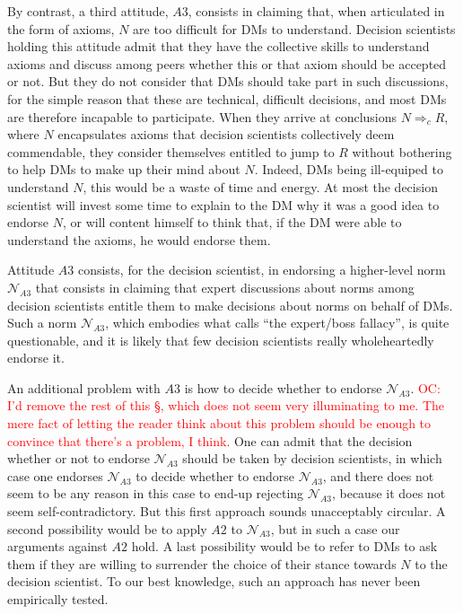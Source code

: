 \documentclass[preprint, french, english, 11pt, authoryear]{elsarticle}%
\newcommand{\commentOC}[1]{\textcolor{red}{OC: #1}}
\begin{document}
By contrast, a third attitude, $A3$, consists in claiming that, when articulated in the form of axioms, $N$ are too difficult for \acp{DM} to understand. Decision scientists holding this attitude admit that they have the collective skills to understand axioms and discuss among peers whether this or that axiom should be accepted or not. But they do not consider that \acp{DM} should take part in such discussions, for the simple reason that these are technical, difficult decisions, and most \acp{DM} are therefore incapable to participate. When they arrive at conclusions $N ⇒_c R$, where $N$ encapsulates axioms that decision scientists collectively deem commendable, they consider themselves entitled to jump to $R$ without bothering to help \acp{DM} to make up their mind about $N$. Indeed, \acp{DM} being ill-equiped to understand $N$, this would be a waste of time and energy. At most the decision scientist will invest some time to explain to the \ac{DM} why it was a good idea to endorse $N$, or will content himself to think that, if the \ac{DM} were able to understand the axioms, he would endorse them.

Attitude $A3$ consists, for the decision scientist, in endorsing a higher-level norm $\mathscr{N}_{A3}$ that consists in claiming that expert discussions about norms among decision scientists entitle them to make decisions about norms on behalf of \acp{DM}. Such a norm $\mathscr{N}_{A3}$, which embodies what \citet{estlund_democratic_2009} calls ``the expert/boss fallacy'', is quite questionable, and it is likely that few decision scientists really wholeheartedly endorse it. 

An additional problem with $A3$ is how to decide whether to endorse $\mathscr{N}_{A3}$. \commentOC{I’d remove the rest of this §, which does not seem very illuminating to me. The mere fact of letting the reader think about this problem should be enough to convince that there’s a problem, I think.}
One can admit that the decision whether or not to endorse $\mathscr{N}_{A3}$ should be taken by decision scientists, in which case one endorses $\mathscr{N}_{A3}$ to decide whether to endorse $\mathscr{N}_{A3}$, and there does not seem to be any reason in this case to end-up rejecting $\mathscr{N}_{A3}$, because it does not seem self-contradictory. But this first approach sounds unacceptably circular. A second possibility would be to apply $A2$ to $\mathscr{N}_{A3}$, but in such a case our arguments against $A2$ hold. A last possibility would be to refer to \acp{DM} to ask them if they are willing to surrender the choice of their stance towards $N$ to the decision scientist. To our best knowledge, such an approach has never been empirically tested.
\end{document}
